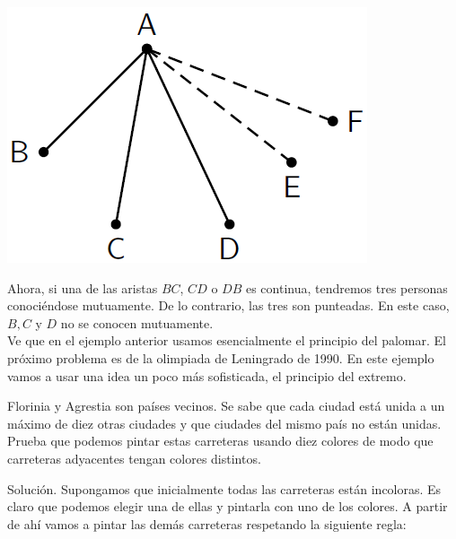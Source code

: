 \documentclass[11pt]{scrartcl}
\begin{document}
\begin{center}
    \includegraphics[scale=0.75]{images/clase_10_grafo_4.png}
\end{center}
Ahora, si una de las aristas $BC$, $CD$ o $DB$ es continua, tendremos tres personas conociéndose mutuamente. De lo contrario, las tres son punteadas. En este caso, $B, C$ y $D$ no se conocen mutuamente.\\

Ve que en el ejemplo anterior usamos esencialmente el principio del palomar. El próximo problema es de la olimpiada de Leningrado de 1990. En este ejemplo vamos a usar una idea un poco más sofisticada, el principio del extremo.

\begin{example}
    Florinia y Agrestia son países vecinos. Se sabe que cada ciudad está unida a un máximo de diez otras ciudades y que ciudades del mismo país no están unidas. Prueba que podemos pintar estas carreteras usando diez colores de modo que carreteras adyacentes tengan colores distintos.
\end{example}
Solución. Supongamos que inicialmente todas las carreteras están incoloras. Es claro que podemos elegir una de ellas y pintarla con uno de los colores. A partir de ahí vamos a pintar las demás carreteras respetando la siguiente regla:\\
\end{document}
